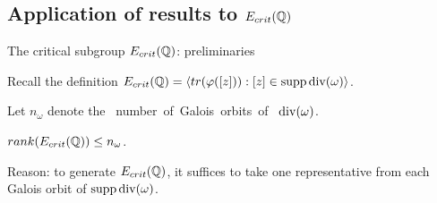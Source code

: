 \documentclass[handout]{beamer}
\begin{document}
\subsection{Application of results to $E_{crit}(\mathbb{Q})$}

\begin{frame}{The critical subgroup $E_{crit}(\mathbb{Q})$: preliminaries}

Recall the definition $E_{crit}(\mathbb{Q})  = \langle tr(\varphi([z])) : [z] \in \operatorname{supp} \operatorname{div}(\omega) \rangle$. \\

\smallskip


\pause

Let $n_{\omega}$ denote the \mbox{ number of Galois orbits of } $\operatorname{div}(\omega)$. \\
\begin{Fact}
$rank(E_{crit}(\mathbb{Q})) \leq n_{\omega}$. 
\end{Fact}
\smallskip

\pause

Reason: to generate $E_{crit}(\mathbb{Q})$, it suffices to take one representative from each Galois orbit of $\operatorname{supp} \operatorname{div}(\omega)$. \\ 













\end{frame}
\end{document}
